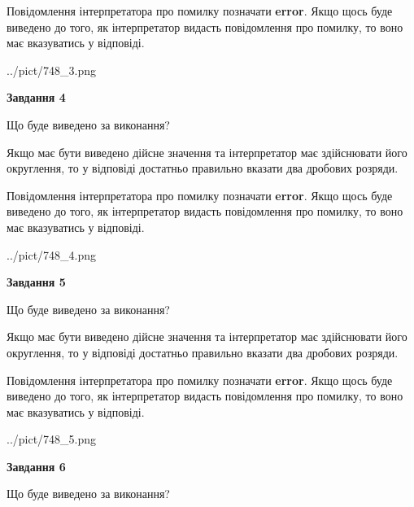 \documentclass[12pt, ukrainian]{article}
\begin{document}
{\begin {Large}
Повідомлення інтерпретатора про помилку позначати \textbf{error}.
Якщо щось буде виведено до того, як інтерпретатор видасть повідомлення про помилку, 
то воно має вказуватись у відповіді. \par

\begin{center}
	{../pict/748_3.png}
\end{center}
\newpage

{\begin {center}\textbf{Завдання 4}\end {center}}\par
Що буде виведено за виконання? \par

Якщо має бути виведено дійсне значення та інтерпретатор має здійснювати його округлення, 
то у відповіді достатньо правильно вказати два дробових розряди.

Повідомлення інтерпретатора про помилку позначати \textbf{error}.
Якщо щось буде виведено до того, як інтерпретатор видасть повідомлення про помилку, 
то воно має вказуватись у відповіді. \par

\begin{center}
	{../pict/748_4.png}
\end{center}
\newpage

{\begin {center}\textbf{Завдання 5}\end {center}}\par
Що буде виведено за виконання? \par

Якщо має бути виведено дійсне значення та інтерпретатор має здійснювати його округлення, 
то у відповіді достатньо правильно вказати два дробових розряди.

Повідомлення інтерпретатора про помилку позначати \textbf{error}.
Якщо щось буде виведено до того, як інтерпретатор видасть повідомлення про помилку, 
то воно має вказуватись у відповіді. \par

\begin{center}
	{../pict/748_5.png}
\end{center}
\newpage

{\begin {center}\textbf{Завдання 6}\end {center}}\par
Що буде виведено за виконання? \par


\end{Large}}
\end{document}
